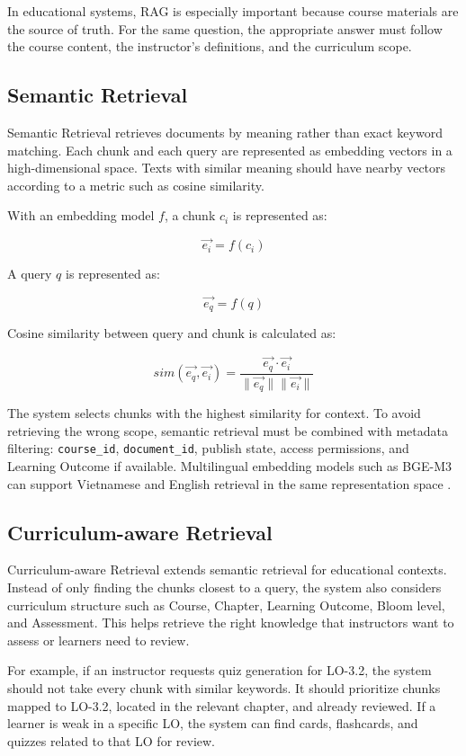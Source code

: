 In educational systems, RAG is especially important because course
materials are the source of truth. For the same question, the appropriate
answer must follow the course content, the instructor's definitions, and
the curriculum scope.

\subsection{Semantic Retrieval}
\label{subsec:semantic-retrieval}

Semantic Retrieval retrieves documents by meaning rather than exact
keyword matching. Each chunk and each query are represented as embedding
vectors in a high-dimensional space. Texts with similar meaning should
have nearby vectors according to a metric such as cosine similarity.

With an embedding model \(f\), a chunk \(c_i\) is represented as:

\[
    \vec{e_i} = f(c_i)
\]

A query \(q\) is represented as:

\[
    \vec{e_q} = f(q)
\]

Cosine similarity between query and chunk is calculated as:

\[
    sim(\vec{e_q}, \vec{e_i}) =
    \frac{\vec{e_q} \cdot \vec{e_i}}{\|\vec{e_q}\| \|\vec{e_i}\|}
\]

The system selects chunks with the highest similarity for context. To
avoid retrieving the wrong scope, semantic retrieval must be combined
with metadata filtering: \texttt{course\_id}, \texttt{document\_id},
publish state, access permissions, and Learning Outcome if available.
Multilingual embedding models such as BGE-M3 can support Vietnamese and
English retrieval in the same representation space \cite{chen2024bge}.

\subsection{Curriculum-aware Retrieval}
\label{subsec:curriculum-aware-retrieval}

Curriculum-aware Retrieval extends semantic retrieval for educational
contexts. Instead of only finding the chunks closest to a query, the
system also considers curriculum structure such as Course, Chapter,
Learning Outcome, Bloom level, and Assessment. This helps retrieve the
right knowledge that instructors want to assess or learners need to
review.

For example, if an instructor requests quiz generation for LO-3.2, the
system should not take every chunk with similar keywords. It should
prioritize chunks mapped to LO-3.2, located in the relevant chapter, and
already reviewed. If a learner is weak in a specific LO, the system can
find cards, flashcards, and quizzes related to that LO for review.

